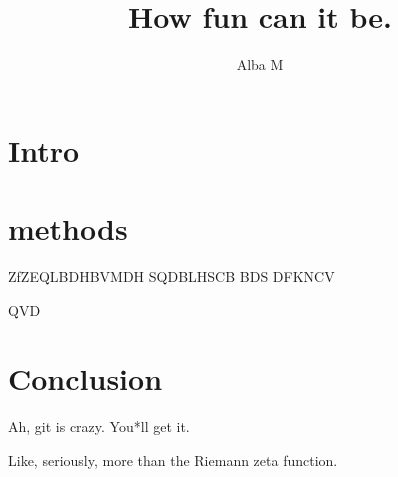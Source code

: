 \documentclass{article}
\author{Alba M}
\title{How fun can it be.}
\begin{document}
	\maketitle
	\section{Intro}
	\section{methods}
	ZfZEQLBDHBVMDH
	SQDBLHSCB
	BDS
	DFKNCV
	
	QVD
	
	\section{Conclusion}
	Ah, git is crazy. You*ll get it.
	
	Like, seriously, more than the Riemann zeta function.
\end{document}
